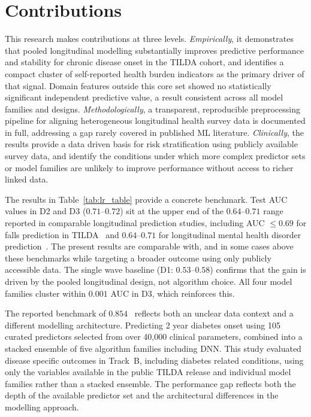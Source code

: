 \section{Contributions}
This research makes contributions at three levels. \emph{Empirically}, it demonstrates that pooled longitudinal modelling substantially improves predictive performance and stability for chronic disease onset in the \gls{TILDA} cohort, and identifies a compact cluster of self-reported health burden indicators as the primary driver of that signal. Domain features outside this core set showed no statistically significant independent predictive value, a result consistent across all model families and designs. \emph{Methodologically}, a transparent, reproducible preprocessing pipeline for aligning heterogeneous longitudinal health survey data is documented in full, addressing a gap rarely covered in published \gls{ML} literature. \emph{Clinically}, the results provide a data driven basis for risk stratification using publicly available survey data, and identify the conditions under which more complex predictor sets or model families are unlikely to improve performance without access to richer linked data.

The results in Table~\ref{tab:lr_table} provide a concrete benchmark. Test \gls{AUC} values in D2 and D3 ($0.71$--$0.72$) sit at the upper end of the $0.64$--$0.71$ range reported in comparable longitudinal prediction studies, including \gls{AUC} $\leq 0.69$ for falls prediction in \gls{TILDA}~\cite{donoghueUsingConditionalInference2023} and $0.64$--$0.71$ for longitudinal mental health disorder prediction~\cite{zhangMachineLearningModels2025}. The present results are comparable with, and in some cases above these benchmarks while targeting a broader outcome using only publicly accessible data. The single wave baseline (D1: $0.53$--$0.58$) confirms that the gain is driven by the pooled longitudinal design, not algorithm choice. All four model families cluster within $0.001$ \gls{AUC} in D3, which reinforces this. 

The reported benchmark of $0.854$~\cite{xuTailoredMachineLearning2023} reflects both an unclear data context and a different modelling architecture. Predicting 2 year diabetes onset using 105 curated predictors selected from over 40,000 clinical parameters, combined into a stacked ensemble of five algorithm families including \gls{DNN}. This study evaluated disease specific outcomes in Track~B, including diabetes related conditions, using only the variables available in the public \gls{TILDA} release and individual model families rather than a stacked ensemble. The performance gap reflects both the depth of the available predictor set and the architectural differences in the modelling approach.

